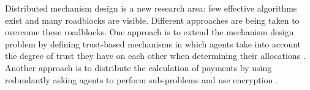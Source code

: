 Distributed mechanism design is a new research area: few effective
algorithms exist and many roadblocks are visible. Different approaches
are being taken to overcome these roadblocks. One approach is to
extend the mechanism design problem by defining trust-based mechanisms
in which agents take into account the degree of trust they have on
each other when determining their allocations \cite{dash04a}. Another
approach is to distribute the calculation of  payments by
using redundantly asking agents to perform sub-problems
\cite{parkes04a} and use encryption \cite{monderer99a}.











